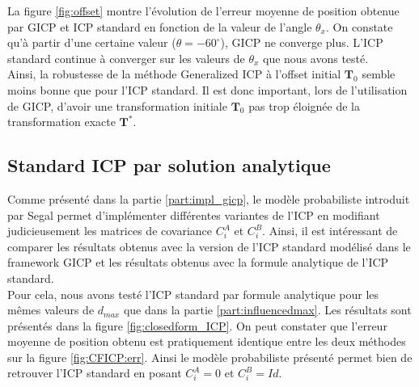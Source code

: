 La figure \ref{fig:offset} montre l'évolution de l'erreur moyenne de position obtenue par GICP et ICP standard en fonction de la valeur de l'angle $\theta_{x}$. On constate qu'à partir d'une certaine valeur ($\theta = -60^{\circ}$), GICP ne converge plus. L'ICP standard continue à converger sur les valeurs de $\theta_{x}$ que nous avons testé.\\

Ainsi, la robustesse de la méthode Generalized ICP à l'offset initial $\mathbf{T}_0$ semble moins bonne que pour l'ICP standard. Il est donc important, lors de l'utilisation de GICP, d'avoir une transformation initiale $\mathbf{T}_0$ pas trop éloignée de la transformation exacte $\mathbf{T}^*$.

\subsection{Standard ICP par solution analytique}

Comme présenté dans la partie \ref{part:impl_gicp}, le modèle probabiliste introduit par Segal permet d'implémenter différentes variantes de l'ICP en modifiant judicieusement les matrices de covariance $C_{i}^A$ et $C_{i}^B$. Ainsi, il est intéressant de comparer les résultats obtenus avec la version de l'ICP standard modélisé dans le framework GICP et les résultats obtenus avec la formule analytique de l'ICP standard. \\

Pour cela, nous avons testé l'ICP standard par formule analytique pour les mêmes valeurs de $d_{max}$ que dans la partie \ref{part:influencedmax}. Les résultats sont présentés dans la figure \ref{fig:closedform_ICP}. On peut constater que l'erreur moyenne de position obtenu est pratiquement identique entre les deux méthodes sur la figure \ref{fig:CFICP:err}. Ainsi le modèle probabiliste présenté permet bien de retrouver l'ICP standard en posant  $C_{i}^A = 0$ et $C_{i}^B = Id$.\\

